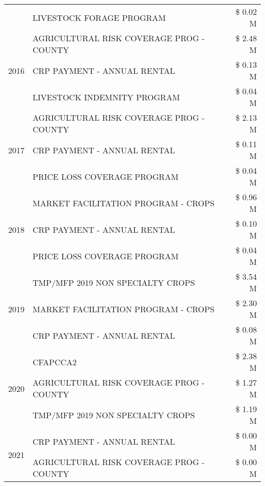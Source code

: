 \begin{tabular}{llr}
 & LIVESTOCK FORAGE PROGRAM & \$ 0.02 M \\
\cline{1-3}
\multirow[t]{3}{*}{2016} & AGRICULTURAL RISK COVERAGE PROG - COUNTY & \$ 2.48 M \\
 & CRP PAYMENT - ANNUAL RENTAL & \$ 0.13 M \\
 & LIVESTOCK INDEMNITY PROGRAM & \$ 0.04 M \\
\cline{1-3}
\multirow[t]{3}{*}{2017} & AGRICULTURAL RISK COVERAGE PROG - COUNTY & \$ 2.13 M \\
 & CRP PAYMENT - ANNUAL RENTAL & \$ 0.11 M \\
 & PRICE LOSS COVERAGE PROGRAM & \$ 0.04 M \\
\cline{1-3}
\multirow[t]{3}{*}{2018} & MARKET FACILITATION PROGRAM - CROPS & \$ 0.96 M \\
 & CRP PAYMENT - ANNUAL RENTAL & \$ 0.10 M \\
 & PRICE LOSS COVERAGE PROGRAM & \$ 0.04 M \\
\cline{1-3}
\multirow[t]{3}{*}{2019} & TMP/MFP 2019 NON SPECIALTY CROPS & \$ 3.54 M \\
 & MARKET FACILITATION PROGRAM - CROPS & \$ 2.30 M \\
 & CRP PAYMENT - ANNUAL RENTAL & \$ 0.08 M \\
\cline{1-3}
\multirow[t]{3}{*}{2020} & CFAPCCA2 & \$ 2.38 M \\
 & AGRICULTURAL RISK COVERAGE PROG - COUNTY & \$ 1.27 M \\
 & TMP/MFP 2019 NON SPECIALTY CROPS & \$ 1.19 M \\
\cline{1-3}
\multirow[t]{2}{*}{2021} & CRP PAYMENT - ANNUAL RENTAL & \$ 0.00 M \\
 & AGRICULTURAL RISK COVERAGE PROG - COUNTY & \$ 0.00 M \\
\cline{1-3}
\bottomrule
\end{tabular}
